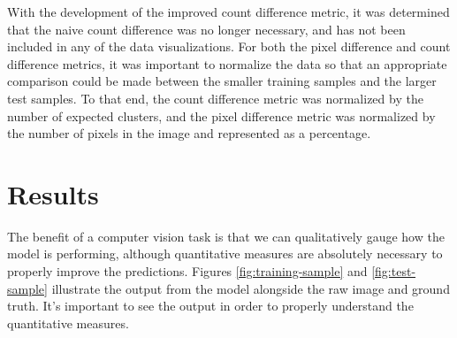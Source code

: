 \documentclass{article}
\begin{document}
With the development of the improved count difference metric, it was 
determined that the naive count difference was no longer necessary, and has 
not been included in any of the data visualizations. For both the pixel 
difference and count difference metrics, it was important to normalize the 
data so that an appropriate comparison could be made between the smaller 
training samples and the larger test samples. To that end, the count 
difference metric was normalized by the number of expected clusters, and the 
pixel difference metric was normalized by the number of pixels in the image 
and represented as a percentage.

\section{Results}

The benefit of a computer vision task is that we can qualitatively gauge how 
the model is performing, although quantitative measures are absolutely 
necessary to properly improve the predictions. Figures 
\ref{fig:training-sample} and \ref{fig:test-sample} illustrate the output 
from the model alongside the raw image and ground truth. It's important to 
see the output in order to properly understand the quantitative measures.
\end{document}

